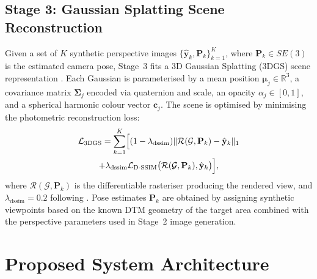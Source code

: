 \documentclass[10pt,journal]{IEEEtran}
\begin{document}
\subsection{Stage 3: Gaussian Splatting Scene Reconstruction}
\label{sec:gs_formulation}
Given a set of $K$ synthetic perspective images
$\{\hat{\mathbf{y}}_k, \mathbf{P}_k\}_{k=1}^{K}$, where $\mathbf{P}_k \in
SE(3)$ is the estimated camera pose, Stage~3 fits a 3D Gaussian Splatting (3DGS)
scene representation \cite{kerbl2023gaussian}. Each Gaussian is parameterised
by a mean position $\boldsymbol{\mu}_j \in \mathbb{R}^3$, a covariance matrix
$\boldsymbol{\Sigma}_j$ encoded via quaternion and scale, an opacity
$\alpha_j \in [0,1]$, and a spherical harmonic colour vector $\mathbf{c}_j$.
The scene is optimised by minimising the photometric reconstruction loss:
\begin{multline}
  \mathcal{L}_{3\mathrm{DGS}} = \sum_{k=1}^{K} \Bigl[
    (1 - \lambda_{\mathrm{dssim}})
    \|\mathcal{R}(\mathcal{G}, \mathbf{P}_k) - \hat{\mathbf{y}}_k\|_1 \\
    + \lambda_{\mathrm{dssim}}
    \mathcal{L}_{\mathrm{D\text{-}SSIM}}\bigl(\mathcal{R}(\mathcal{G}, \mathbf{P}_k),
    \hat{\mathbf{y}}_k\bigr) \Bigr],
  \label{eq:gs_loss}
\end{multline}
where $\mathcal{R}(\mathcal{G}, \mathbf{P}_k)$ is the differentiable rasteriser
producing the rendered view, and $\lambda_{\mathrm{dssim}} = 0.2$ following
\cite{kerbl2023gaussian}. Pose estimates $\mathbf{P}_k$ are obtained by
assigning synthetic viewpoints based on the known DTM geometry of the target
area combined with the perspective parameters used in Stage~2 image generation.

\section{Proposed System Architecture}
\label{sec:architecture}
\end{document}
